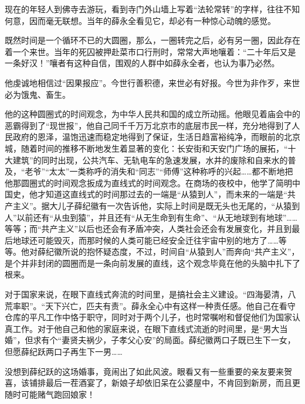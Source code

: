 \par 现在的年轻人到佛寺去游玩，看到寺门外山墙上写着“法轮常转”的字样，往往不知何意，因而毫无联想。当年的薛永全看见它，却必有一种惊心动魄的感觉。
\par 既然时间是一个循环不已的大圆圈，那么，一圈转完之后，必有另一圈，因此存在着一个来世。当年的死囚被押赴菜市口行刑时，常常大声地嚷着：“二十年后又是一条好汉！”嚷者有这种自信，围观的人群中如薛永全者，也认为事乃必然。
\par 他虔诚地相信过“因果报应”。今世行善积德，来世必有好报。今世为非作歹，来世必为饿鬼、畜生。
\par 他的这种圆圈式的时间观念，为中华人民共和国的成立所动摇。他眼见着庙会中的恶霸得到了“现世报”，他自己同千千万万北京市的底层市民一样，充分地得到了人民政府的恩泽，温饱迅速而稳定地得到了保证，生活日趋富裕纯净，而眼前的北京城，随着时间的推移不断地发生着显著的变化：长安街和天安门广场的展拓，“十大建筑”的同时出现，公共汽车、无轨电车的急速发展，水井的废除和自来水的普及，“老爷”“太太”一类称呼的消失和“同志”“师傅”这种称呼的兴起……都不断地把他那圆圈式的时间观念扳成为直线式的时间观念。在商场的夜校中，他学了简明中国史，他才知道这直线式的时间那过去的一端是“从猿到人”，而未来的一端是“共产主义”。据大儿子薛纪徽有一次告诉他，实际上时间是既无头也无尾的，“从猿到人”以前还有“从虫到猿”，并且还有“从无生命到有生命”、“从无地球到有地球”……等等；而“共产主义”以后也还会有矛盾冲突，人类社会还会有发展变化，并且到最后地球还可能毁灭，而那时候的人类可能已经安全迁往宇宙中别的地方了……等等。他对薛纪徽所说的抱怀疑态度，不过，时间自“从猿到人”而奔向“共产主义”，是个并非封闭的圆圈而是一条向前发展的直线，这个观念毕竟在他的头脑中扎下了根来。
\par 对于国家来说，在眼下直线式奔流的时间里，是搞社会主义建设。“四海晏清，八荒率职”。“天下兴亡，匹夫有责”。薛永全心中有这样一种责任感。他自己在看守仓库的平凡工作中恪于职守，同时对于两个儿子，也时常嘱咐和督促他们为国家认真工作。对于他自己和他的家庭来说，在眼下直线式流逝的时间里，是“男大当婚”，但求有个“妻贤夫祸少，子孝父心安”的局面。薛纪徽两口子既已生下一女，但愿薛纪跃两口子再生下一男……
\par 没想到薛纪跃的这场婚事，竟闹出了如此风波。眼看又有一些重要的亲友要来贺喜，该铺排最后一茬酒宴了，新娘子却依旧呆在公婆屋中，不肯回到新房，而且更随时可能赌气跑回娘家！
